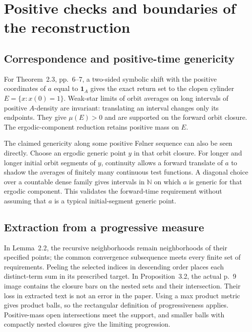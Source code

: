 \documentclass[10pt]{article}
\begin{document}
\section*{Positive checks and boundaries of the reconstruction}
\subsection*{Correspondence and positive-time genericity}
For Theorem 2.3, pp. 6–7, a two-sided symbolic shift with the positive coordinates of \(a\) equal to \(\mathbf 1_A\) gives the exact return set to the clopen cylinder \(E=\{x:x(0)=1\}\). Weak-star limits of orbit averages on long intervals of positive \(A\)-density are invariant: translating an interval changes only its endpoints. They give \(\mu(E)>0\) and are supported on the forward orbit closure. The ergodic-component reduction retains positive mass on \(E\).\par
The claimed genericity along some positive Følner sequence can also be seen directly. Choose an ergodic generic point \(y\) in that orbit closure. For longer and longer initial orbit segments of \(y\), continuity allows a forward translate of \(a\) to shadow the averages of finitely many continuous test functions. A diagonal choice over a countable dense family gives intervals in \(\mathbb N\) on which \(a\) is generic for that ergodic component. This validates the forward-time requirement without assuming that \(a\) is a typical initial-segment generic point.\par
\subsection*{Extraction from a progressive measure}
In Lemma 2.2, the recursive neighborhoods remain neighborhoods of their specified points; the common convergence subsequence meets every finite set of requirements. Peeling the selected indices in descending order places each distinct-term sum in its prescribed target. In Proposition 3.2, the actual p. 9 image contains the closure bars on the nested sets and their intersection. Their loss in extracted text is not an error in the paper. Using a max product metric gives product balls, so the rectangular definition of progressiveness applies. Positive-mass open intersections meet the support, and smaller balls with compactly nested closures give the limiting progression.\par
\end{document}
